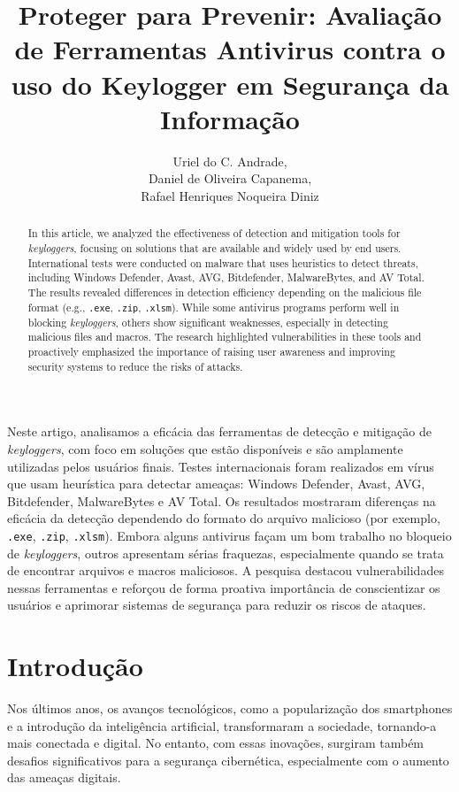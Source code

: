 \documentclass[12pt]{article}
\title{Proteger para Prevenir: Avaliação de Ferramentas Antivirus contra o uso do Keylogger em Segurança da Informação\\ }
\author{Uriel do C. Andrade\inst{1},\\
Daniel de Oliveira Capanema\inst{1}, \\
Rafael Henriques Noqueira Diniz\inst{1}}
\begin{document}
\maketitle
\begin{abstract}
    In this article, we analyzed the effectiveness of detection and mitigation tools for \textit{keyloggers}, focusing on solutions that are available and widely used by end users. International tests were conducted on malware that uses heuristics to detect threats, including Windows Defender, Avast, AVG, Bitdefender, MalwareBytes, and AV Total. The results revealed differences in detection efficiency depending on the malicious file format (e.g., \texttt{.exe}, \texttt{.zip}, \texttt{.xlsm}). While some antivirus programs perform well in blocking \textit{keyloggers}, others show significant weaknesses, especially in detecting malicious files and macros. The research highlighted vulnerabilities in these tools and proactively emphasized the importance of raising user awareness and improving security systems to reduce the risks of attacks.
\end{abstract}

\begin{resumo}
    Neste artigo, analisamos a eficácia das ferramentas de detecção e mitigação de \textit{keyloggers}, com foco em soluções que estão disponíveis e são amplamente utilizadas pelos usuários finais. Testes internacionais foram realizados em vírus que usam heurística para detectar ameaças: Windows Defender, Avast, AVG, Bitdefender, MalwareBytes e AV Total. Os resultados mostraram diferenças na eficácia da detecção dependendo do formato do arquivo malicioso (por exemplo, \texttt{.exe}, \texttt{.zip}, \texttt{.xlsm}). Embora alguns antivirus façam um bom trabalho no bloqueio de \textit{keyloggers}, outros apresentam sérias fraquezas, especialmente quando se trata de encontrar arquivos e macros maliciosos.  A pesquisa destacou vulnerabilidades nessas ferramentas e reforçou de forma proativa importância de conscientizar os usuários e aprimorar sistemas de segurança para reduzir os riscos de ataques.\end{resumo}
\section{Introdução}

Nos últimos anos, os avanços tecnológicos, como a popularização dos smartphones e a introdução da inteligência artificial, transformaram a sociedade, tornando-a mais conectada e digital. No entanto, com essas inovações, surgiram também desafios significativos para a segurança cibernética, especialmente com o aumento das ameaças digitais.
\end{document}
